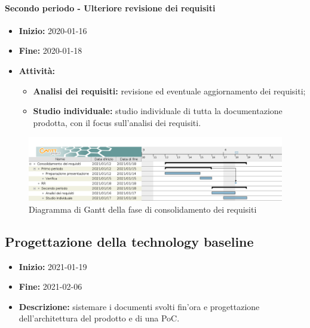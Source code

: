 \paragraph[Secondo periodo]{Secondo periodo - \textnormal{Ulteriore revisione dei requisiti}}
\begin{itemize}
    \item [] \textbf{Inizio:} 2020-01-16
    \item [] \textbf{Fine:} 2020-01-18
    \item [] \textbf{Attività:}
          \begin{itemize}
              \item \textbf{Analisi dei requisiti:} revisione ed eventuale aggiornamento dei requisiti;
              \item \textbf{Studio individuale:} studio individuale di tutta la documentazione prodotta, con il focus sull'analisi dei requisiti.
          \end{itemize}
\end{itemize}

\begin{figure}[H]
    \centering
    \includegraphics[width=1\linewidth]{res/images/pianificazione/consolidamento_dei_requisiti.png}
    \caption{Diagramma di Gantt della fase di consolidamento dei requisiti}
    \label{fig:_Gantt consolidamento dei requisiti}
\end{figure}



\subsection{Progettazione della technology baseline} \label{_pianificazioneProgettazioneTechnologyBaseline}
\begin{itemize}
    \item []\textbf{Inizio:} 2021-01-19
    \item []\textbf{Fine:} 2021-02-06
    \item []\textbf{Descrizione:} sistemare i documenti svolti fin'ora e progettazione dell'architettura del prodotto e di una PoC.
\end{itemize}

